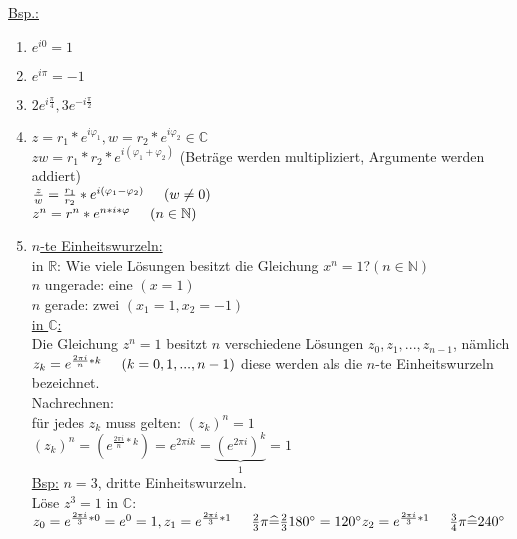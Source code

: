 \documentclass[a4paper,11pt]{article}
\newcommand{\hsp}{\hspace{5mm}}
\begin{document}
\begin{enumerate}[label=\arabic*)]
	\underline{Bsp.:}
	\begin{enumerate}[label=\alph*)]
		\item $e^{i0}=1$ 
		\item $e^{i\pi}=-1$
		\item $2e^{i\frac{\pi}{4}},3e^{-i\frac{\pi}{2}}$
		\item $z=r_1*e^{i\varphi_1},w=r_2*e^{i\varphi_2}\in\mathbb{C}$ \\
		$zw=r_1*r_2*e^{i(\varphi_1+\varphi_2)}$ (Beträge werden multipliziert, Argumente werden addiert) \\
		$\frac{z}{w}=\frac{r_1}{r_2}*e^{i(\varphi_1-\varphi_2)}\hsp(w\neq0)$ \\
		$z^n=r^n*e^{n*i*\varphi}\hsp(n\in\mathbb{N})$
		\item \underline{$n$-te Einheitswurzeln:} \\
		in $\mathbb{R}$: Wie viele Lösungen besitzt die Gleichung $x^n=1$?\hsp$(n\in\mathbb{N})$ \\
		$n$ ungerade: eine $(x=1)$ \\
		$n$ gerade: zwei $(x_1=1,x_2=-1)$ \\
		\underline{in $\mathbb{C}$:} \\ Die Gleichung $z^n=1$ besitzt $n$ verschiedene Lösungen $z_0,z_1,...,z_{n-1}$, nämlich \\
		$z_k=e^{\frac{2\pi i}{n}*k}\hsp(k=0,1,...,n-1)$ diese werden als die $n$-te Einheitswurzeln bezeichnet. \\
		Nachrechnen: \\
		für jedes $z_k$ muss gelten: $(z_k)^n=1$ \\
		$(z_k)^n=(e^{\frac{2\pi i}{n}*k})=e^{2\pi i k}=\underbrace{(e^{2\pi i})^k}_{1}=1$ \\
		\underline{Bsp:} $n=3$, dritte Einheitswurzeln. \\
		Löse $z^3=1$ in $\mathbb{C}:$ \\
		$z_0=e^{\frac{2\pi i}{3}*0}=e^0=1, \\
		z_1=e^{\frac{2\pi i}{3}*1}\hsp\frac{2}{3}\pi\widehat{=}\frac{2}{3}180^\circ=120^\circ \\
		z_2=e^{\frac{2\pi i}{3}*1}\hsp\frac{3}{4}\pi\widehat{=}240^\circ$
	\end{enumerate}
\end{enumerate}

\newpage
\end{document}
